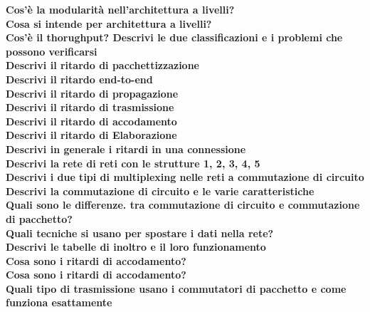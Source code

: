 \documentclass[11pt, oneside]{article}   	%
\begin{document}
\textbf{Cos'è la modularità nell'architettura a livelli?}\\

\textbf{Cosa si intende per architettura a livelli?}\\

\textbf{Cos'è il thorughput? Descrivi le due classificazioni e i problemi che possono verificarsi}\\

\textbf{Descrivi il ritardo di pacchettizzazione}\\

\textbf{Descrivi il ritardo end-to-end}\\

\textbf{Descrivi il ritardo di propagazione}\\

\textbf{Descrivi il ritardo di trasmissione}\\

\textbf{Descrivi il ritardo di accodamento}\\

\textbf{Descrivi il ritardo di Elaborazione}\\

\textbf{Descrivi in generale i ritardi in una connessione}\\

\textbf{Descrivi la rete di reti con le strutture 1, 2, 3, 4, 5}\\

\textbf{Descrivi i due tipi di multiplexing nelle reti a commutazione di circuito}\\

\textbf{Descrivi la commutazione di circuito e le varie caratteristiche}\\

\textbf{Quali sono le differenze. tra commutazione di circuito e commutazione di pacchetto?}\\

\textbf{Quali tecniche si usano per spostare i dati nella rete?}\\

\textbf{Descrivi le tabelle di inoltro e il loro funzionamento}\\

\textbf{Cosa sono i ritardi di accodamento?}\\

\textbf{Cosa sono i ritardi di accodamento?}\\

\textbf{Quali tipo di trasmissione usano i commutatori di pacchetto e come funziona esattamente}\\
\end{document}
